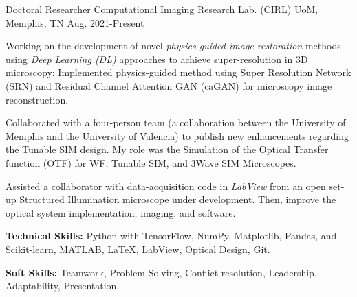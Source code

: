 

\begin{cventries}

  \cventry
    {Doctoral Researcher} %
    {Computational Imaging Research Lab. (CIRL)} %
    {UoM, Memphis, TN} %
    {Aug. 2021-Present} %
    {
      \begin{cvitems} %
                \item{Working on the development of novel \textit{physics-guided image restoration} methods using \textit{Deep Learning (DL)} approaches to achieve super-resolution in 3D microscopy: Implemented physics-guided method using Super Resolution Network (SRN) and Residual Channel Attention GAN (caGAN) for microscopy image reconstruction.}
              \item{Collaborated with a four-person team (a collaboration between the University of Memphis and the University of Valencia) to publish new enhancements regarding the Tunable SIM design. My role was the Simulation of the Optical Transfer function (OTF) for WF, Tunable SIM, and 3Wave SIM Microscopes.}
              \item{Assisted a collaborator with data-acquisition code in \textit{LabView} from an open set-up Structured Illumination microscope under development. Then, improve the optical system implementation, imaging, and software.}
          \item {\textbf{Technical Skills:} Python with TensorFlow, NumPy, Matplotlib, Pandas, and Scikit-learn, MATLAB, \LaTeX, LabView, Optical Design, Git.}
        \item {\textbf{Soft Skills:} Teamwork, Problem Solving, Conflict resolution, Leadership, Adaptability, Presentation.}
      \end{cvitems}
    }
  

\end{cventries}
